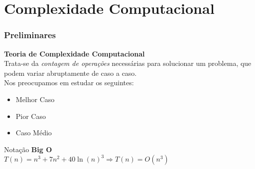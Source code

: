 \documentclass{beamer}
\begin{document}
\section{Complexidade Computacional}
\begin{frame}
\frametitle{\normalsize Preliminares}
	\large \textbf{Teoria de Complexidade Computacional}
	\\
	\normalsize \vspace{0.2cm} Trata-se da \textit{contagem de operações} necessárias para solucionar um problema, que podem variar abruptamente de caso a caso.
	\\ \vspace{0.3cm}Nos preocupamos em estudar os seguintes:
\begin{itemize}
	\item Melhor Caso
	\item Pior Caso
	\item Caso Médio
\end{itemize}

\vspace{0.2cm}\large Notação \textbf{Big O}
\\\vspace{0.2cm}\normalsize $T(n) = n^3 + 7n^2+ 40\ln{(n)}^3 \Rightarrow T(n) = O(n^3)$


\vspace{-2cm}
\begin{figure}
	\begin{flushright}
	\end{flushright}
\end{figure}
\end{frame}

\end{document}
